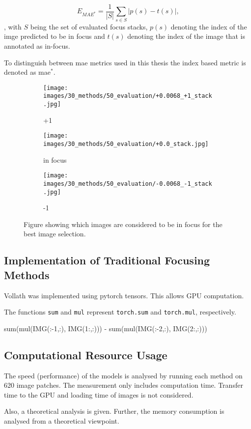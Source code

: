 $$E_{MAE^*} = \frac{1}{|S|}\sum_{s \in S} |p(s) - t(s)| \text{,}$$, with $S$ being the set of evaluated focus stacks, $p(s)$ denoting the index of the imge predicted to be in focus and $t(s)$ denoting the index of the image that is annotated as in-focus.

To distinguish between \ac{mae} metrics used in this thesis the index based metric is denoted as \ac{mae}$^*$.

\begin{figure}[tb]
    \centering
    \begin{subfigure}[t]{0.3\textwidth}
        \centering
        \texttt{[image: images/30\_methods/50\_evaluation/+0.0068\_+1\_stack.jpg]}
        \caption{+1}
    \end{subfigure}
    \begin{subfigure}[t]{0.3\textwidth}
        \centering
        \texttt{[image: images/30\_methods/50\_evaluation/+0.0\_stack.jpg]}
        \caption{in focus}
    \end{subfigure}
    \begin{subfigure}[t]{0.3\textwidth}
        \centering
        \texttt{[image: images/30\_methods/50\_evaluation/-0.0068\_-1\_stack.jpg]}
        \caption{-1}
    \end{subfigure}

    \caption{Figure showing which images are considered to be in focus for the best image selection.}
    \label{fig:Methods:Data:InFocusExampleImages}
\end{figure}


\subsection{Implementation of Traditional Focusing Methods}
\label{sec:Methods:Evaluation:Traditional}

Vollath was implemented using pytorch tensors. This allows GPU computation.

The functions \texttt{sum} and \texttt{mul} represent \texttt{torch.sum} and \texttt{torch.mul}, respectively.

\begin{verbatim*}
sum(mul(IMG(:-1,:), IMG(1:,:))) - sum(mul(IMG(:-2,:), IMG(2:,:)))
\end{verbatim*}

\subsection{Computational Resource Usage}
\label{sec:Methods:Evaluation:Computation}

The speed (performance) of the models is analysed by running each method on 620 image patches. The measurement only includes computation time. Transfer time to the GPU and loading time of images is not considered.

Also, a theoretical analysis is given. Further, the memory consumption is analysed from a theoretical viewpoint. 

